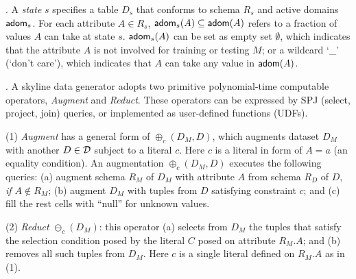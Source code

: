 . 
A {\em state} $s$ %
specifies a table $D_s$ that conforms to 
schema $R_s$ and active domains ${\mathsf{adom}}_s$. 
For each attribute $A\in R_s$, 
${\mathsf{adom}}_s(A) \subseteq {\ensuremath{\mathsf{adom}}}(A)$ 
refers to a fraction of values $A$ can take at state $s$. ${\mathsf{adom}}_s(A)$ 
can be set as empty set $\emptyset$, 
which indicates that 
the attribute $A$ 
is not involved for training or testing $M$; or a wildcard `\_' (`don't care'), 
which indicates that $A$ 
can take any value in ${\mathsf{adom}}(A)$. 

.
A skyline data generator adopts two %
primitive 
polynomial-time computable operators, 
{\em Augment} and {\em Reduct}. 
These operators can be %
expressed by SPJ (select, project,  
join) queries, or implemented as user-defined 
functions (UDFs). 

\sstab
(1) {\em Augment}  
has a general form of $\oplus_c(D_M, D)$, %
which augments dataset $D_M$ with another  
$D\in {\mathcal D}$ subject to a literal $c$. Here $c$ is a literal in form of $A = a$
(an equality condition). An augmentation $\oplus_{c}(D_M, D)$ executes the following queries: 
(a) augment schema $R_M$ of $D_M$ 
with attribute $A$ from 
schema $R_D$ of $D$, {\em if $A\not\in R_M$};  
(b) augment $D_M$ with 
tuples from $D$ %
satisfying constraint $c$; and 
(c) fill the rest 
cells with ``null'' for unknown values.

\sstab
(2) {\em Reduct} $\ominus_c(D_M)$: 
this operator%
(a) selects from $D_M$ the tuples 
that satisfy the selection condition posed by 
the literal $C$ posed on attribute $R_M.A$; and 
(b) %
removes all such tuples from $D_M$. 
Here $c$ is a single literal defined on $R_M.A$ as in (1). 


